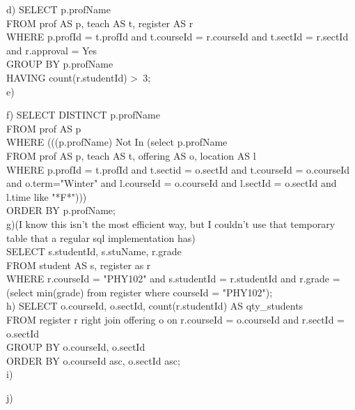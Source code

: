 \documentclass{article}
\begin{document}
d)
SELECT p.profName \\
FROM prof AS p, teach AS t, register AS r \\
WHERE p.profId = t.profId and t.courseId = r.courseId and t.sectId = r.sectId and r.approval = Yes \\
GROUP BY p.profName \\
HAVING count(r.studentId) \textgreater \ 3; \\

e)

f)
SELECT DISTINCT p.profName \\
FROM prof AS p \\
WHERE (((p.profName) Not In (select p.profName \\
FROM prof AS p, teach AS t, offering AS o, location AS l \\
WHERE p.profId = t.profId and t.sectid = o.sectId and t.courseId = o.courseId and o.term="Winter" and l.courseId = o.courseId and l.sectId = o.sectId and l.time like "*F*"))) \\
ORDER BY p.profName; \\

g)(I know this isn't the most efficient way, but I couldn't use that temporary table that a regular sql implementation has)\\
SELECT s.studentId, s.stuName, r.grade\\
FROM student AS s, register as r \\
WHERE r.courseId = "PHY102" and s.studentId = r.studentId and r.grade =(select min(grade) from register  where courseId = "PHY102");\\

h)
SELECT  o.courseId, o.sectId, count(r.studentId) AS qty\_students \\
FROM register r right join offering o on r.courseId = o.courseId and r.sectId = o.sectId \\
GROUP BY o.courseId, o.sectId \\
ORDER BY o.courseId asc, o.sectId asc; \\

i)

j)
\end{document}
